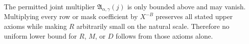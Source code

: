 \begin{remark}
\label{rem:no-lower-from-axioms}
The permitted joint multiplier
\(\mathfrak A_{\alpha,\gamma}(j)\) is only bounded above and may
vanish.  Multiplying every row or mask coefficient by
\(X^{-B}\) preserves all stated upper axioms while making \(R\)
arbitrarily small on the natural scale.  Therefore no uniform lower
bound for \(R\), \(M\), or \(D\) follows from those axioms alone.
\end{remark}
